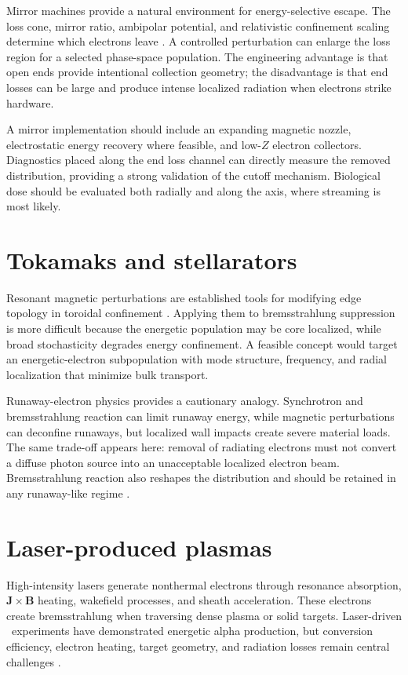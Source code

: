 Mirror machines provide a natural environment for energy-selective escape. The loss cone, mirror ratio, ambipolar potential, and relativistic confinement scaling determine which electrons leave \cite{pastukhov1974,ochs2023mirror}. A controlled perturbation can enlarge the loss region for a selected phase-space population. The engineering advantage is that open ends provide intentional collection geometry; the disadvantage is that end losses can be large and produce intense localized radiation when electrons strike hardware.

A mirror implementation should include an expanding magnetic nozzle, electrostatic energy recovery where feasible, and low-$Z$ electron collectors. Diagnostics placed along the end loss channel can directly measure the removed distribution, providing a strong validation of the cutoff mechanism. Biological dose should be evaluated both radially and along the axis, where streaming is most likely.

\section{Tokamaks and stellarators}

Resonant magnetic perturbations are established tools for modifying edge topology in toroidal confinement \cite{evans2004,fitzpatrick1993,wesson2011}. Applying them to bremsstrahlung suppression is more difficult because the energetic population may be core localized, while broad stochasticity degrades energy confinement. A feasible concept would target an energetic-electron subpopulation with mode structure, frequency, and radial localization that minimize bulk transport.

Runaway-electron physics provides a cautionary analogy. Synchrotron and bremsstrahlung reaction can limit runaway energy, while magnetic perturbations can deconfine runaways, but localized wall impacts create severe material loads. The same trade-off appears here: removal of radiating electrons must not convert a diffuse photon source into an unacceptable localized electron beam. Bremsstrahlung reaction also reshapes the distribution and should be retained in any runaway-like regime \cite{embreus2016}.

\section{Laser-produced plasmas}

High-intensity lasers generate nonthermal electrons through resonance absorption, $\mathbf{J}\times\mathbf{B}$ heating, wakefield processes, and sheath acceleration. These electrons create bremsstrahlung when traversing dense plasma or solid targets. Laser-driven \pB \  experiments have demonstrated energetic alpha production, but conversion efficiency, electron heating, target geometry, and radiation losses remain central challenges \cite{labaune2013,picciotto2014,giuffrida2020}.

